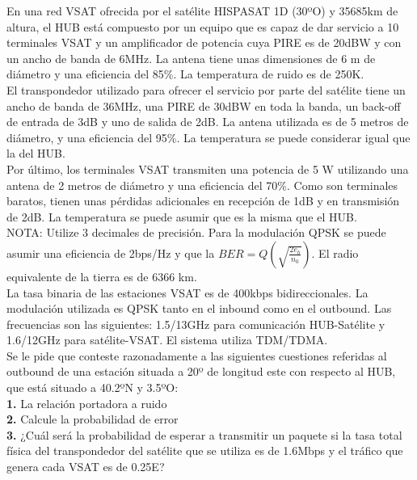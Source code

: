 \begin{exercise}[5]
	En una red VSAT ofrecida por el satélite HISPASAT 1D (30ºO) y 35685km de altura, el HUB está compuesto por un equipo que es capaz de dar servicio a 10 terminales VSAT y un amplificador de potencia cuya PIRE es de 20dBW y con un ancho de banda de 6MHz. La antena tiene unas dimensiones de 6 m de diámetro y una eficiencia del 85\%. La temperatura de ruido es de 250K.\\
	El transpondedor utilizado para ofrecer el servicio por parte del satélite tiene un ancho de banda de 36MHz, una PIRE de 30dBW en toda la banda, un back-off de entrada de 3dB y uno de salida de 2dB. La antena utilizada es de 5 metros de diámetro, y una eficiencia del 95\%. La temperatura se puede considerar igual que la del HUB.\\
	Por último, los terminales VSAT transmiten una potencia de 5 W utilizando una antena de 2 metros de diámetro y una eficiencia del 70\%. Como son terminales baratos, tienen unas pérdidas adicionales en recepción de 1dB y en transmisión de 2dB. La temperatura se puede asumir que es la misma que el HUB.\\
	NOTA: Utilize 3 decimales de precisión. Para la modulación QPSK se puede asumir una eficiencia de 2bps/Hz y que la $BER=Q(\sqrt{\frac{2e_b}{n_0}})$. El radio equivalente de la tierra es de 6366 km.\\
	La tasa binaria de las estaciones VSAT es de 400kbps bidireccionales. La modulación utilizada es QPSK tanto en el inbound como en el outbound. Las frecuencias son las siguientes: 1.5/13GHz para comunicación HUB-Satélite y 1.6/12GHz para satélite-VSAT. El sistema utiliza TDM/TDMA.\\
	Se le pide que conteste razonadamente a las siguientes cuestiones referidas al outbound de una estación situada a 20º de longitud este con respecto al HUB, que está situado a 40.2ºN y 3.5ºO: \\
	\textbf{1.} La relación portadora a ruido\\
	\textbf{2.} Calcule la probabilidad de error\\
	\textbf{3.} ¿Cuál será la probabilidad de esperar a transmitir un paquete si la tasa total física del transpondedor del satélite que se utiliza es de 1.6Mbps y el tráfico que genera cada VSAT es de 0.25E? 
\end{exercise}
